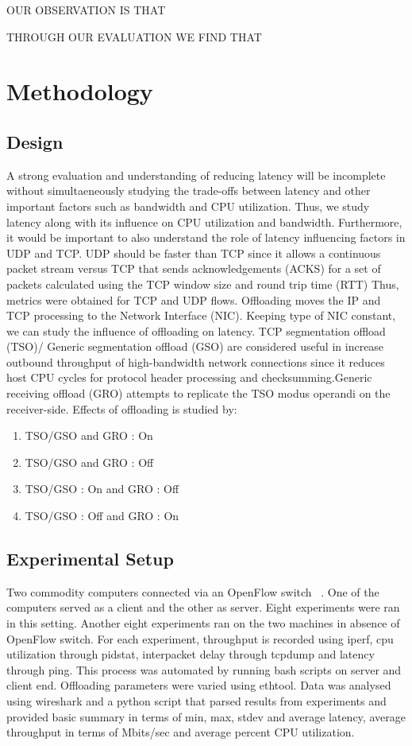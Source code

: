 OUR OBSERVATION IS THAT

THROUGH OUR EVALUATION WE FIND THAT

\section{Methodology}
\subsection{Design}
A strong evaluation and understanding of reducing latency will be incomplete
without simultaeneously studying the trade-offs between latency and other
important factors such as bandwidth and CPU utilization. Thus, we study latency
along with its influence on CPU utilization and bandwidth. Furthermore, it would be 
important to also understand the role of latency influencing factors in UDP and
TCP. UDP should be faster than TCP since it allows a continuous packet stream
versus TCP that sends acknowledgements (ACKS) for a set of packets calculated
using the TCP window size and round trip time (RTT) Thus, metrics were obtained
for TCP and UDP flows.  Offloading moves the IP and TCP processing to the
Network Interface (NIC).  Keeping type of NIC constant, we can study the
influence of offloading on latency. TCP segmentation offload (TSO)/ Generic
segmentation offload (GSO) are considered useful in increase outbound
throughput of high-bandwidth network connections since it reduces host CPU cycles
for protocol header processing and checksumming.Generic receiving offload (GRO)
    attempts to replicate the TSO modus operandi on the receiver-side. Effects
    of offloading is studied by:

\begin{enumerate} 
\item TSO/GSO and GRO : On 
\item TSO/GSO and GRO : Off 
\item TSO/GSO : On and GRO : Off 
\item TSO/GSO : Off and GRO : On 
\end{enumerate} 

\subsection{Experimental Setup} 
Two commodity computers connected via an OpenFlow switch ~\cite{openflow}. One
of the computers served as a client and the other as server. Eight experiments
were ran in this setting. Another eight experiments ran on the two machines in
absence of OpenFlow switch. For each experiment, throughput is recorded using
iperf, cpu utilization through pidstat, interpacket delay through tcpdump and
latency through ping. This process was automated by running bash scripts on
server and client end. Offloading parameters were varied using ethtool. Data was
analysed using wireshark and a python script that parsed results from
experiments and provided basic summary in terms of min, max, stdev and average latency, 
average throughput in terms of Mbits/sec and average percent CPU utilization.
